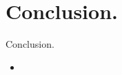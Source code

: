 \documentclass{beamer}
\def\timeleft{15:00->14:55}
\begin{document}
\def\timeleft{0:30->0:00}
\section{Conclusion.}
\begin{frame}{Conclusion.}
  \begin{block}{}
    \begin{itemize}[<+->]
    \item
    \end{itemize}
  \end{block}
\end{frame}

\begin{frame}{}
\end{frame}

\begin{frame}{}
\end{frame}
\end{document}
